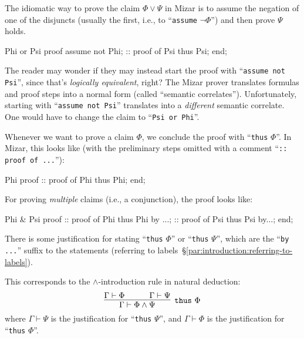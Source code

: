The idiomatic way to prove the claim $\Phi\lor\Psi$ in Mizar is to
assume the negation of one of the disjuncts (usually the first, i.e.,
to ``\verb#assume# $\neg\Phi$'') and then prove $\Psi$ holds.
\begin{mizar}
Phi or Psi
proof
  assume not Phi;
  :: proof of Psi
  thus Psi;
end;
\end{mizar}

\begin{ddanger}
  The reader may wonder if they may instead start the proof with
  ``\verb#assume not Psi#'', since that's \emph{logically equivalent}, right?
  The Mizar prover translates formulas and proof steps into a normal
  form (called ``semantic correlates'').
  Unfortunately, starting with ``\verb#assume not Psi#'' translates into
  a \emph{different} semantic correlate. One would have to change the
  claim to ``\verb#Psi or Phi#''.
\end{ddanger}

Whenever we want to prove a claim $\Phi$, we conclude the proof with
``\texttt{thus} $\Phi$''. In Mizar, this looks like (with the
preliminary steps omitted with a comment ``\verb#:: proof of ...#''):

\begin{mizar}
Phi
proof
  :: proof of Phi
  thus Phi;
end;
\end{mizar}

For proving \emph{multiple} claims (i.e., a conjunction), the proof
looks like:

\begin{mizar}
Phi & Psi
proof
  :: proof of Phi
  thus Phi by ...;
  :: proof of Psi
  thus Psi by...;
end;
\end{mizar}
There is some justification for stating ``\verb#thus# $\Phi$'' or
``\verb#thus# $\Psi$'', which are the ``\verb#by ...#'' suffix to the
statements (referring to labels~\S\ref{par:introduction:referring-to-labels}).

This corresponds to the $\land$-introduction rule in natural deduction:
\begin{equation}
  \infer[\mathtt{thus}~\Phi]{\Gamma\vdash\Phi\land\Psi}{
    \Gamma\vdash\Phi &\qquad \Gamma\vdash\Psi}
\end{equation}
where $\Gamma\vdash\Psi$ is the justification for ``\verb#thus# $\Psi$'',
and $\Gamma\vdash\Phi$ is the justification for ``\verb#thus# $\Phi$''.

